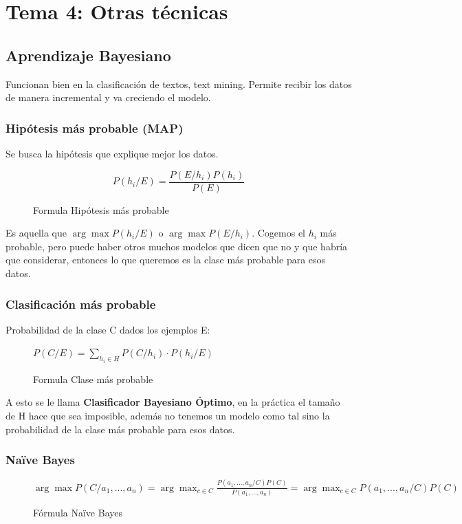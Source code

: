 \documentclass[12pt, twoside, openright]{report} %
\begin{document}
\chapter{Tema 4: Otras técnicas}

\section{Aprendizaje Bayesiano}

Funcionan bien en la clasificación de textos, text mining. Permite
recibir los datos de manera incremental y va creciendo el modelo.

\subsection{Hipótesis más probable
	(MAP)}

Se busca la hipótesis que explique mejor los datos.
\begin{figure}[H]
	\[P(h_i/E)= \frac {P(E/h_i)P(h_i)}{P(E)}\]
	\captionsetup{justification=centering}
	\caption{Formula Hipótesis más probable}
\end{figure}

Es aquella que \(\arg \max P(h_i/E)\) o $\arg \max P(E/h_i) $.
Cogemos el \(h_i\) más probable, pero puede haber otros muchos modelos
que dicen que no y que habría que considerar, entonces lo que queremos
es la clase más probable para esos datos.

\subsection{Clasificación más
	probable}

Probabilidad de la clase C dados los ejemplos E:
\begin{figure}[H]
	\(P(C/E) = \sum _{h_i \in H} P(C/h_i) \cdot P(h_i/E)\)
	\captionsetup{justification=centering}
	\caption{Formula Clase más probable}
\end{figure}

A esto se le llama \textbf{Clasificador Bayesiano Óptimo}, en la práctica el tamaño de H hace que sea imposible, además no tenemos un modelo como tal sino la probabilidad de la clase más probable para esos datos.

\subsection{Naïve Bayes}

\begin{figure}[H]
	\(\arg \max P(C/a_1, ...,a_n)= \arg \max _{c \in C} \frac {P(a_1, ...,a_n/C)P(C)}{P(a_1, ...,a_n)}=\arg \max_{c \in C} P(a_1, ...,a_n/C)P(C)\)
	\captionsetup{justification=centering}
	\caption{Fórmula Naïve Bayes}
\end{figure}
\end{document}

